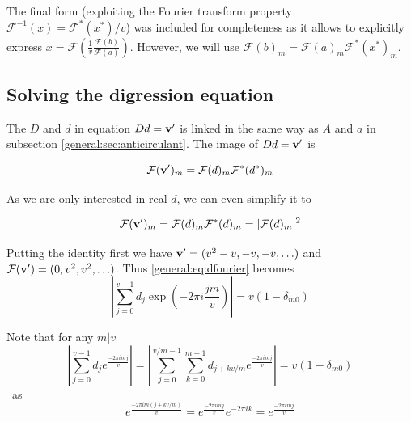 \documentclass{article}
\theoremstyle{plain}
\theoremstyle{definition}
\theoremstyle{remark}
\begin{document}
                The final form (exploiting the Fourier transform property $\mathcal{F}^{-1}(x) = \mathcal{F}^*(x^*)/v$) was included for completeness as it allows to explicitly express $x = \mathcal{F} \left(\frac1v \frac{\mathcal{F}(b)}{\mathcal{F}(a)} \right)$. However, we will use $\mathcal{F} (b)_m = \mathcal{F}(a)_m \mathcal{F}^*(x^*)_m$.
            
            \subsection{Solving the digression equation}
                The $D$ and $d$ in equation $Dd=\bf v'$ is linked in the same way as $A$ and $a$ in subsection \ref{general:sec:anticirculant}. The image of $Dd=\bf v'$ is
                
                \begin{equation}
                    \mathcal{F} ({\bf v'})_m = \mathcal{F}(d)_m \mathcal{F^*}(d^*)_m
                \end{equation}

                As we are only interested in real $d$, we can even simplify it to
                
                \begin{equation}
                    \label{general:eq:dfourier}
                    \mathcal{F} ({\bf v'})_m = \mathcal{F}(d)_m \mathcal{F^*}(d)_m = |\mathcal{F}(d)_m|^2
                \end{equation}
                
                Putting the identity first we have ${\bf v'} = (v^2-v, -v, -v, \ldots)$ and $\mathcal{F}({\bf v'}) = (0,v^2,v^2,\ldots)$. Thus \eqref{general:eq:dfourier} becomes
                \begin{equation}
                    \left| \sum_{j=0}^{v-1} d_j \exp(-2\pi i \frac{jm}v) \right| = v (1-\delta_{m0})
                \end{equation}

                Note that for any $m | v$
                \begin{equation}
                    \label{general:eq:split_fourier}
                    \left| \sum_{j=0}^{v-1} d_j e^{\frac{-2\pi i m j}v} \right|
                    = \left| \sum_{j=0}^{v/m-1} \sum_{k=0}^{m-1}  d_{j+kv/m} e^{\frac{-2\pi i m j}v} \right|
                    =v (1-\delta_{m0})
                \end{equation}\
                as 
                \begin{equation}
                    e^{\frac{-2\pi i m (j+kv/m)}v} = e^{\frac{-2\pi i m j}v} e^{-2\pi i k} = e^{\frac{-2\pi i m j}v}
                \end{equation}
                
\end{document}
